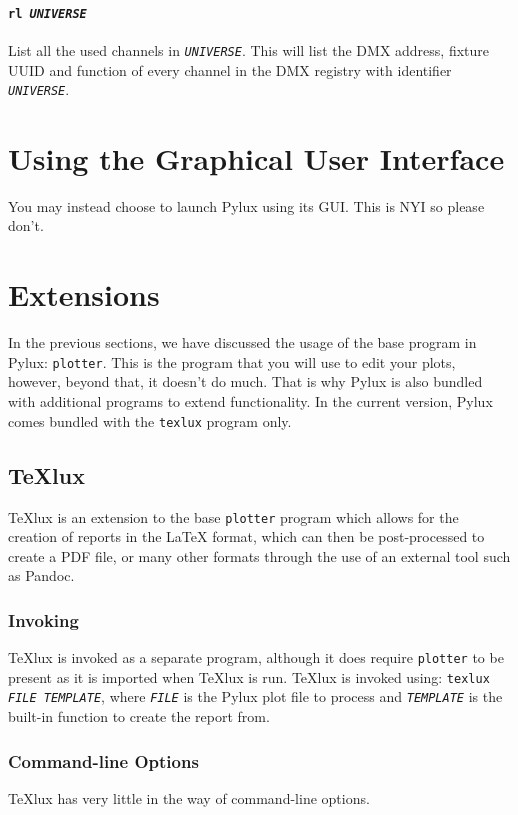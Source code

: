 \documentclass[a4paper]{article}
\begin{document}
\paragraph{\texttt{rl \textit{UNIVERSE}}}
List all the used channels in \texttt{\textit{UNIVERSE}}. This will list the 
DMX address, fixture UUID and function of every channel in the DMX registry 
with identifier \texttt{\textit{UNIVERSE}}.

\section{Using the Graphical User Interface}
You may instead choose to launch Pylux using its GUI. This is NYI so please 
don't.

\section{Extensions}
In the previous sections, we have discussed the usage of the base program in 
Pylux: \texttt{plotter}. This is the program that you will use to edit your
plots, however, beyond that, it doesn't do much. That is why Pylux is also 
bundled with additional programs to extend functionality. In the current 
version, Pylux comes bundled with the \texttt{texlux} program only.

\subsection{TeXlux}
TeXlux is an extension to the base \texttt{plotter} program which allows for 
the creation of reports in the \LaTeX{} format, which can then be 
post-processed to create a PDF file, or many other formats through the use of 
an external tool such as Pandoc.

\subsubsection{Invoking}
TeXlux is invoked as a separate program, although it does require 
\texttt{plotter} to be present as it is imported when TeXlux is run. TeXlux is 
invoked using: \texttt{texlux \textit{FILE} \textit{TEMPLATE}}, where 
\texttt{\textit{FILE}} is the Pylux plot file to process and 
\texttt{\textit{TEMPLATE}} is the built-in function to create the report from.

\subsubsection{Command-line Options}
TeXlux has very little in the way of command-line options.
\end{document}
